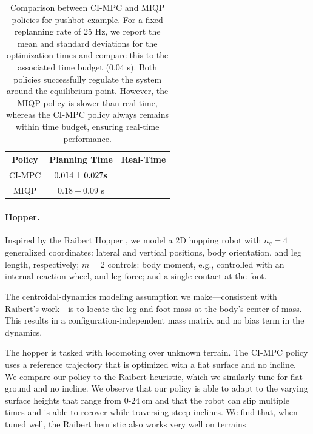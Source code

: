 \begin{table}[H]
	\centering
	\caption[Numerical comparison between CI-MPC and MIQP policies for pushbot push recovery]{Comparison between CI-MPC and MIQP policies for pushbot example. For a fixed replanning rate of 25 Hz, we report the mean and standard deviations for the optimization times and compare this to the associated time budget (0.04 s). Both policies successfully regulate the system around the equilibrium point. However, the MIQP policy is slower than real-time, whereas the CI-MPC policy always remains within time budget, ensuring real-time performance.}
	
	\begin{tabular}{c c c}
		\toprule
		\textbf{Policy} &
		\textbf{Planning Time} &
		\textbf{Real-Time} \\
		\toprule
		CI-MPC & \boldmath $0.014 \pm 0.027 \mbox{\textbf{s}}$ \unboldmath & \checkmark \\ 
		MIQP   & $0.18  \pm 0.09$ s & \ding{53} \\ 
		\toprule
	\end{tabular}
	\label{cipc_pushbot_results}
\end{table}

\paragraph{Hopper.}
Inspired by the Raibert Hopper \cite{raibert1989dynamically}, we model a 2D hopping robot with $n_q = 4$ generalized coordinates: lateral and vertical positions, body orientation, and leg length, respectively; $m = 2$ controls: body moment, e.g., controlled with an internal reaction wheel, and leg force; and a single contact at the foot. 

The centroidal-dynamics modeling assumption we make---consistent with Raibert's work---is to locate the leg and foot mass at the body's center of mass. This results in a configuration-independent mass matrix and no bias term in the dynamics. 

The hopper is tasked with locomoting over unknown terrain. The CI-MPC policy uses a reference trajectory that is optimized with a flat surface and no incline. We compare our policy to the Raibert heuristic, which we similarly tune for flat ground and no incline. We observe that our policy is able to adapt to the varying surface heights that range from $0\mbox{-}24\:$cm and that the robot can slip multiple times and is able to recover while traversing steep inclines. We find that, when tuned well, the Raibert heuristic also works very well on terrains


